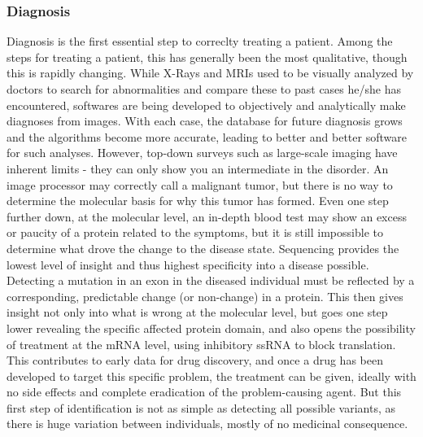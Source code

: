\documentclass{easychithesis}
\begin{document}
\subsubsection{Diagnosis}
Diagnosis is the first essential step to correclty treating a patient. Among the steps for treating a patient, this has generally been the most qualitative, though this is rapidly changing. While X-Rays and MRIs used to be visually analyzed by doctors to search for abnormalities and compare these to past cases he/she has encountered, softwares are being developed to objectively and analytically make diagnoses from images. With each case, the database for future diagnosis grows and the algorithms become more accurate, leading to better and better software for such analyses. However, top-down surveys such as large-scale imaging have inherent limits - they can only show you an intermediate in the disorder. An image processor may correctly call a malignant tumor, but there is no way to determine the molecular basis for why this tumor has formed. Even one step further down, at the molecular level, an in-depth blood test may show an excess or paucity of a protein related to the symptoms, but it is still impossible to determine what drove the change to the disease state. Sequencing provides the lowest level of insight and thus highest specificity into a disease possible. Detecting a mutation in an exon in the diseased individual must be reflected by a corresponding, predictable change (or non-change) in a protein. This then gives insight not only into what is wrong at the molecular level, but goes one step lower revealing the specific affected protein domain, and also opens the possibility of treatment at the mRNA level, using inhibitory ssRNA to block translation. This contributes to early data for drug discovery, and once a drug has been developed to target this specific problem, the treatment can be given, ideally with no side effects and complete eradication of the problem-causing agent. But this first step of identification is not as simple as detecting all possible variants, as there is huge variation between individuals, mostly of no medicinal consequence.
\end{document}

